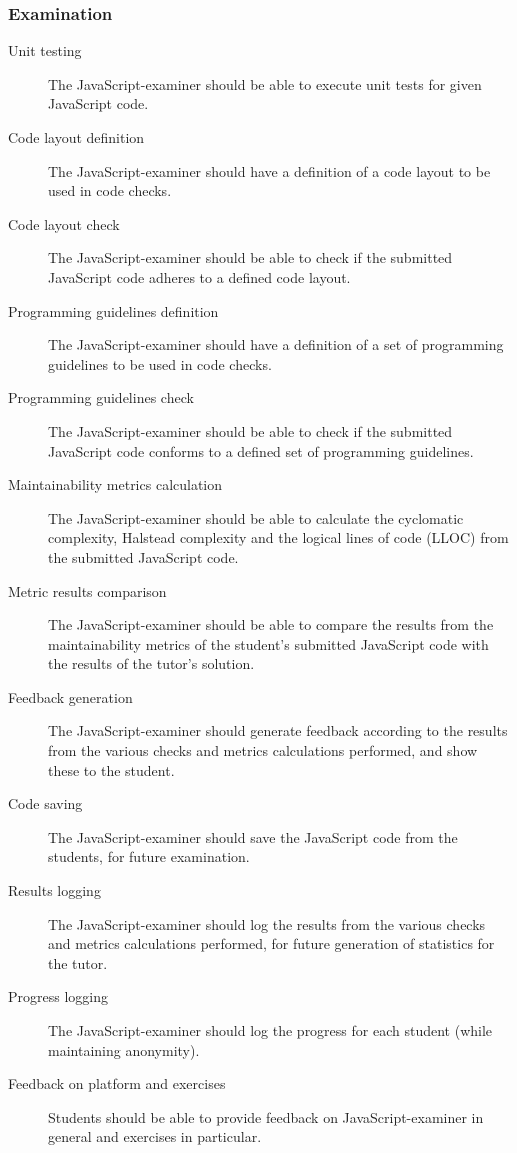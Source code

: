 \subsubsection{Examination}
\begin{description}
  \item[Unit testing] The JavaScript-examiner should be able to execute unit 
    tests for given JavaScript code.
  \item[Code layout definition] The JavaScript-examiner should have a
    definition of a code layout to be used in code checks.
  \item[Code layout check] The JavaScript-examiner should be able to check if 
    the submitted JavaScript code adheres to a defined code layout.
  \item[Programming guidelines definition] The JavaScript-examiner should have
    a definition of a set of programming guidelines to be used in code checks.
  \item[Programming guidelines check] The JavaScript-examiner should be able to
    check if the submitted JavaScript code conforms to a defined set of
    programming guidelines.
  \item[Maintainability metrics calculation] The JavaScript-examiner should be 
    able to calculate the cyclomatic complexity, Halstead complexity and the 
    logical lines of code (LLOC) from the submitted JavaScript code.
  \item[Metric results comparison] The JavaScript-examiner should be able to
    compare the results from the maintainability metrics of the student's
    submitted JavaScript code with the results of the tutor's solution.
  \item[Feedback generation] The JavaScript-examiner should generate feedback
    according to the results from the various checks and metrics calculations
    performed, and show these to the student.
  \item[Code saving] The JavaScript-examiner should save the JavaScript code
    from the students, for future examination.
  \item[Results logging] The JavaScript-examiner should log the results from
    the various checks and metrics calculations performed, for future
    generation of statistics for the tutor.
  \item[Progress logging] The JavaScript-examiner should log the progress for each
    student (while maintaining anonymity).
  \item[Feedback on platform and exercises] Students should be able to provide
    feedback on JavaScript-examiner in general and exercises in particular.
\end{description}

